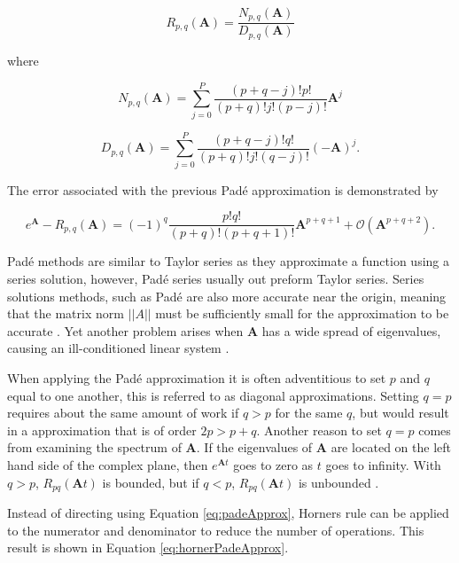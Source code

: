 \begin{equation}
    R_{p,q}(\boldsymbol{A}) = \frac{N_{p,q}(\boldsymbol{A})}{D_{p,q}(\boldsymbol{A})}
    \label{eq:padeApprox}
\end{equation}

\noindent where

\begin{equation*}
    N_{p,q}(\boldsymbol{A}) = \sum_{j=0}^{P}\frac{(p + q - j)!p!}{(p + q)!j!(p - j)!}\boldsymbol{A}^{j}
\end{equation*}

\begin{equation*}
    D_{p,q}(\boldsymbol{A}) = \sum_{j=0}^{P}\frac{(p + q - j)!q!}{(p + q)!j!(q - j)!}(-\boldsymbol{A})^{j}.
\end{equation*}

\noindent The error associated with the previous Pad\'e approximation is demonstrated by \cite{higham2005}

\begin{equation}
    e^{\boldsymbol{A}} - R_{p,q}(\boldsymbol{A}) = (-1)^{q}\frac{p!q!}{(p+q)!(p+q+1)!}\boldsymbol{A}^{p+q+1} + \mathcal{O}(\boldsymbol{A}^{p+q+2}).
\end{equation}

Pad\'e methods are similar to Taylor series as they approximate a function using a series solution, however, Pad\'e series usually out preform Taylor series. Series solutions methods, such as Pad\'e are also more accurate near the origin, meaning that the matrix norm $||A||$ must be sufficiently small for the approximation to be accurate \cite{pusa2010}. Yet another problem arises when $\boldsymbol{A}$ has a wide spread of eigenvalues, causing an ill-conditioned linear system  \cite{exokit} \cite{moler2003}.  

When applying the Pad\'e approximation it is often adventitious to set $p$ and $q$ equal to one another, this is referred to as diagonal approximations. Setting $q = p$ requires about the same amount of work if $q > p$ for the same $q$, but would result in a approximation that is of order $2p > p + q$. Another reason to set $q=p$ comes from examining the spectrum of $\boldsymbol{A}$. If the eigenvalues of $\boldsymbol{A}$ are located on the left hand side of the complex plane, then $e^{\boldsymbol{A}t}$ goes to zero as $t$ goes to infinity. With $q > p$, $R_{pq}(\boldsymbol{A}t)$ is bounded, but if $q < p$, $R_{pq}(\boldsymbol{A}t)$ is unbounded \cite{moler2003}. 


Instead of directing using Equation \ref{eq:padeApprox}, Horners rule can be applied to the numerator and denominator to reduce the number of operations. This result is shown in Equation \ref{eq:hornerPadeApprox}. 

